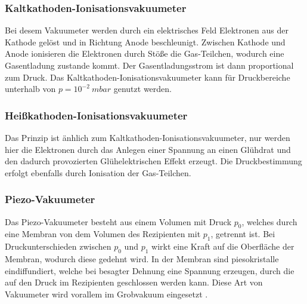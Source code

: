 \subsubsection{Kaltkathoden-Ionisationsvakuumeter}
Bei desem Vakuumeter werden durch ein elektrisches Feld Elektronen aus der Kathode gelöst und in Richtung Anode beschleunigt.
Zwischen Kathode und Anode ionisieren die Elektronen durch Stöße die Gas-Teilchen, wodurch eine Gasentladung zustande kommt.
Der Gasentladungsstrom ist dann proportional zum Druck.
Das Kaltkathoden-Ionisationsvakuumeter kann für Druckbereiche unterhalb von $p = 10^{-2}\: mbar$ genutzt werden\cite{Pfeiffer, S.94}.

\subsubsection{Heißkathoden-Ionisationsvakuumeter}
Das Prinzip ist änhlich zum Kaltkathoden-Ionisationsvakuumeter, nur werden hier die Elektronen durch das Anlegen einer Spannung an einen Glühdrat und den dadurch provozierten 
Glühelektrischen Effekt erzeugt. Die Druckbestimmung erfolgt ebenfalls durch Ionisation der Gas-Teilchen\cite{Pfeiffer, S.94,95}.

\subsubsection{Piezo-Vakuumeter}
Das Piezo-Vakuumeter besteht aus einem Volumen mit Druck $p_0$, welches durch eine Membran von dem Volumen des Rezipienten mit $p_1$, getrennt ist.
Bei Druckunterschieden zwischen $p_0$ und $p_1$ wirkt eine Kraft auf die Oberfläche der Membran, wodurch diese gedehnt wird. In der Membran sind 
piesokristalle eindiffundiert, welche bei besagter Dehnung eine Spannung erzeugen, durch die auf den Druck im Rezipienten geschlossen werden kann.
Diese Art von Vakuumeter wird vorallem im Grobvakuum eingesetzt \cite{Pfeiffer, S.92}.
















